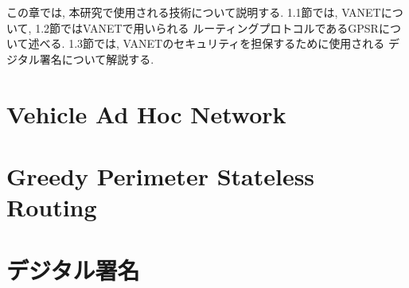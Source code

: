 この章では, 本研究で使用される技術について説明する. 
1.1節では, VANETについて, 1.2節ではVANETで用いられる
ルーティングプロトコルであるGPSRについて述べる. 
1.3節では, VANETのセキュリティを担保するために使用される
デジタル署名について解説する.

\section{Vehicle Ad Hoc Network}

\section{Greedy Perimeter Stateless Routing}

\section{デジタル署名}

